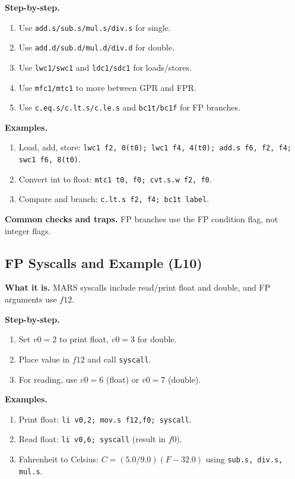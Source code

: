 \documentclass[11pt]{article}
\begin{document}
\textbf{Step-by-step.}
\begin{enumerate}[leftmargin=*]
  \item Use \texttt{add.s/sub.s/mul.s/div.s} for single.
  \item Use \texttt{add.d/sub.d/mul.d/div.d} for double.
  \item Use \texttt{lwc1/swc1} and \texttt{ldc1/sdc1} for loads/stores.
  \item Use \texttt{mfc1/mtc1} to move between GPR and FPR.
  \item Use \texttt{c.eq.s/c.lt.s/c.le.s} and \texttt{bc1t/bc1f} for FP branches.
\end{enumerate}

\textbf{Examples.}
\begin{enumerate}[leftmargin=*]
  \item Load, add, store: \texttt{lwc1 f2, 0(t0); lwc1 f4, 4(t0); add.s f6, f2, f4; swc1 f6, 8(t0)}.
  \item Convert int to float: \texttt{mtc1 t0, f0; cvt.s.w f2, f0}.
  \item Compare and branch: \texttt{c.lt.s f2, f4; bc1t label}.
\end{enumerate}

\textbf{Common checks and traps.} FP branches use the FP condition flag, not integer flags.

\subsection{FP Syscalls and Example (L10)}
\textbf{What it is.} MARS syscalls include read/print float and double, and FP arguments use $f12$.

\textbf{Step-by-step.}
\begin{enumerate}[leftmargin=*]
  \item Set $v0=2$ to print float, $v0=3$ for double.
  \item Place value in $f12$ and call \texttt{syscall}.
  \item For reading, use $v0=6$ (float) or $v0=7$ (double).
\end{enumerate}

\textbf{Examples.}
\begin{enumerate}[leftmargin=*]
  \item Print float: \texttt{li v0,2; mov.s f12,f0; syscall}.
  \item Read float: \texttt{li v0,6; syscall} (result in $f0$).
  \item Fahrenheit to Celsius: $C = (5.0/9.0)(F-32.0)$ using \texttt{sub.s, div.s, mul.s}.
\end{enumerate}
\end{document}
